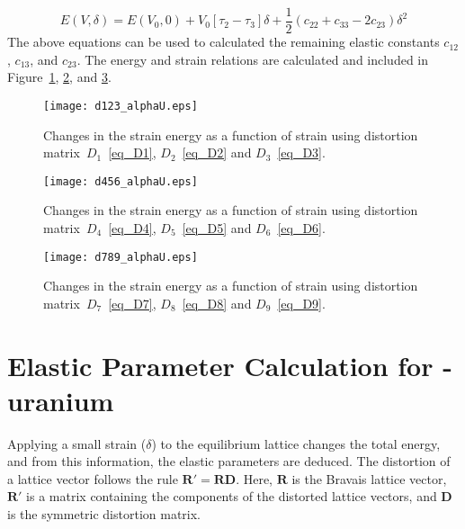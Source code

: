 \begin{appendices}
\begin{equation}
E(V,\delta) = E(V_0, 0) + V_0\left [ \tau_2 - \tau_3 \right ] \delta + \frac{1}{2} \left(c_{22} + c_{33} -2c_{23}  \right)\delta^2
\end{equation}
The above equations can be used to calculated the remaining elastic constants $c_{12}$, $c_{13}$, and $c_{23}$. The energy and strain relations are calculated and included in Figure~\ref{fig_D123}, \ref{fig_D456}, and \ref{fig_D789}. 

\begin{figure}
	\centering
	\texttt{[image: d123\_alphaU.eps]}
	\caption[Changes in strain energy in $D_1$, $D_2$ and $D_3$]{Changes in the strain energy as a function of strain using distortion matrix~$D_1$~\eqref{eq_D1}, $D_2$~\eqref{eq_D2} and $D_3$~\eqref{eq_D3}.}
	\label{fig_D123}
\end{figure}

\begin{figure}
	\centering
	\texttt{[image: d456\_alphaU.eps]}
	\caption[Changes in strain energy in $D_4$, $D_5$ and $D_6$]{Changes in the strain energy as a function of strain using distortion matrix~$D_4$~\eqref{eq_D4}, $D_5$~\eqref{eq_D5} and $D_6$~\eqref{eq_D6}.}
	\label{fig_D456}
\end{figure}

\begin{figure}
	\centering
	\texttt{[image: d789\_alphaU.eps]}
	\caption[Changes in strain energy in $D_7$, $D_8$ and $D_9$]{Changes in the strain energy as a function of strain using distortion matrix~$D_7$~\eqref{eq_D7}, $D_8$~\eqref{eq_D8} and $D_9$~\eqref{eq_D9}.}
	\label{fig_D789}
\end{figure}


\section{Elastic Parameter Calculation for \textgamma-uranium}\label{appen_bccel}
Applying a small strain ($\delta$) to the equilibrium lattice changes the total energy, and from this information, the elastic parameters are deduced. The distortion of a lattice vector follows the rule $\mathbf{R'} = \mathbf{RD}$. Here, $\mathbf{R}$ is the Bravais lattice vector, $\mathbf{R'}$ is a matrix containing the components of the distorted lattice vectors, and $\mathbf{D}$ is the symmetric distortion matrix.



\end{appendices}
